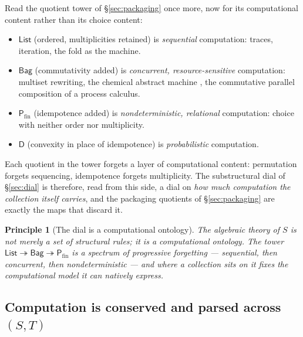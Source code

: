 \documentclass[11pt]{article}
\theoremstyle{definition}
\theoremstyle{plain}
\newtheorem{principle}[definition]{Principle}
\newcommand{\T}{T}
\newcommand{\Coll}{S}
\newcommand{\List}{\mathsf{List}}
\newcommand{\Mset}{\mathsf{Bag}}
\newcommand{\Pfin}{\mathsf{P}_{\mathrm{fin}}}
\newcommand{\Dist}{\mathsf{D}}
\begin{document}
Read the quotient tower of \S\ref{sec:packaging} once more, now for its
computational content rather than its choice content:
\begin{itemize}[leftmargin=1.4em]
\item $\List$ (ordered, multiplicities retained) is \emph{sequential}
      computation: traces, iteration, the fold as the machine.
\item $\Mset$ (commutativity added) is \emph{concurrent, resource-sensitive}
      computation: multiset rewriting, the chemical abstract machine
      \cite{BerryBoudol92}, the commutative parallel composition of a process
      calculus.
\item $\Pfin$ (idempotence added) is \emph{nondeterministic, relational}
      computation: choice with neither order nor multiplicity.
\item $\Dist$ (convexity in place of idempotence) is \emph{probabilistic}
      computation.
\end{itemize}
Each quotient in the tower forgets a layer of computational content:
permutation forgets sequencing, idempotence forgets multiplicity. The
substructural dial of \S\ref{sec:dial} is therefore, read from this side, a
dial on \emph{how much computation the collection itself carries}, and the
packaging quotients of \S\ref{sec:packaging} are exactly the maps that discard
it.

\begin{principle}[The dial is a computational ontology]
\label{prin:onto}
The algebraic theory of $\Coll$ is not merely a set of structural rules; it is
a computational ontology. The tower $\List \twoheadrightarrow \Mset
\twoheadrightarrow \Pfin$ is a spectrum of progressive forgetting ---
sequential, then concurrent, then nondeterministic --- and where a collection
sits on it fixes the computational model it can natively express.
\end{principle}

\subsection{Computation is conserved and parsed across $(\Coll,\T)$}
\end{document}

